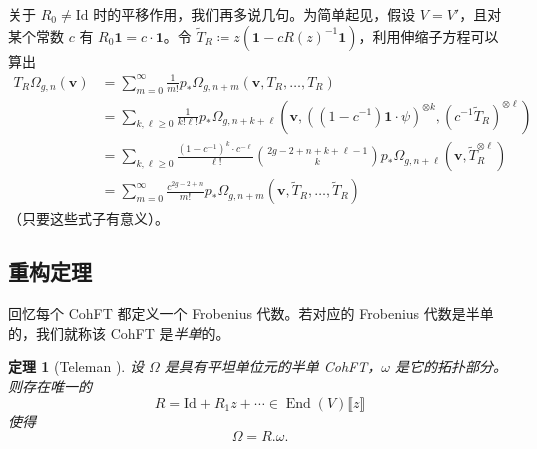\documentclass{amsart}
\newtheorem{thm}{定理}[section]
\theoremstyle{definition}
\theoremstyle{remark}
\theoremstyle{plain}
\theoremstyle{definition}
\theoremstyle{remark}
\newcommand{\mbf}[1]{\mathbf{#1}}
\newcommand{\bv}{\mbf{v}}
\newcommand{\mr}[1]{\mathrm{#1}}
\newcommand{\1}{\mathbf{1}}
\newcommand{\2}{\mathbf{2}}
\newcommand{\3}{\mathbf{3}}
\newcommand{\ps}[1]{\llbracket #1 \rrbracket}
\DeclareMathOperator{\End}{End}
\begin{document}
关于 $R_0 \neq \mr{Id}$ 时的平移作用，我们再多说几句。为简单起见，假设 $V = V'$，且对某个常数 $c$ 有 $R_0 \1 = c \cdot \1$。令 $\tilde{T}_R \coloneqq z( \1 - c R(z)^{-1} \1)$，利用伸缩子方程可以算出
\begin{align*}
    T_R \Omega_{g,n}(\bv) &= \sum_{m=0}^{\infty} \frac{1}{m!} p_*\Omega_{g,n+m}(\bv, T_R, \ldots, T_R) \\
    &= \sum_{k,\ell \geq 0} \frac{1}{k!\ell!} p_* \Omega_{g,n+k+\ell}(\bv, ( (1-c^{-1})\1 \cdot \psi )^{\otimes k}, ( c^{-1} \tilde{T}_R )^{\otimes \ell}) \\
    &= \sum_{k,\ell \geq 0} \frac{(1-c^{-1})^k \cdot c^{-\ell}}{\ell!} \binom{2g-2+n+k+\ell-1}{k} p_* \Omega_{g,n+\ell}(\bv, \tilde{T}_R^{\otimes \ell}) \\
    &= \sum_{m=0}^{\infty} \frac{c^{2g-2+n}}{m!} p_* \Omega_{g,n+m}(\bv, \tilde{T}_R, \ldots, \tilde{T}_R)
\end{align*}
（只要这些式子有意义）。


\subsection{重构定理}%
\label{sub:Reconstruction theorem}

回忆每个 CohFT 都定义一个 Frobenius 代数。若对应的 Frobenius 代数是半单的，我们就称该 CohFT 是\textit{半单}的。

\begin{thm}[Teleman {\cite{Teleman2012}}]%
\label{thm:teleman}
    设 $\Omega$ 是具有平坦单位元的半单 CohFT，$\omega$ 是它的拓扑部分。则存在唯一的
    \[ R = \mr{Id} + R_1 z + \cdots \in \End(V)\ps{z} \]
    使得
    \[ \Omega = R.\omega. \]
\end{thm}
\end{document}
